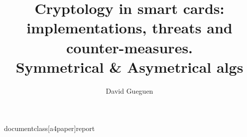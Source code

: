 documentclass[a4paper]{report}
\author{David Gueguen}
\title{Cryptology in smart cards:\\		
		implementations, threats and counter-measures.\\
			Symmetrical \& Asymetrical algs\\						
			}
\usepackage[pdfauthor={David Gueguen},pdftitle={STATeOfTHeARtSmardCardsCryptology},pagebackref,pdftex]{hyperref}	 	
\hypersetup{colorlinks,	
	citecolor=red, filecolor=black, 
		linkcolor=black, urlcolor=blue }
			
\usepackage[a4paper, no foot,hmargin=1.5cm, vmargin=1.5cm,
			 left=1.4cm, right=1.4cm	]
			 	{geometry}

\usepackage[latin1]{inputenc}
\usepackage{textcomp}
\usepackage{graphicx}
\usepackage{mathrsfs, amssymb, bbm, amssymb}
\usepackage{amsmath, amsthm, amsfonts, latexsym, stmaryrd}
\usepackage{marvosym}%


\usepackage{epsfig}
\usepackage[linesnumbered,ruled,vlined]{algorithm2e}



\addtocounter{tocdepth}{3}
\setcounter{secnumdepth}{3} 


\setlength{\parskip}{1em}			 	
\setlength\parindent{20pt}		%
\medskip						%

\usepackage{makeidx}
\makeindex	


\usepackage{natbib}
%

%	



\usepackage{colortbl}
\usepackage{tabularx}
\usepackage{supertabular}
\usepackage{multirow}
\usepackage{relsize}
\usepackage{longtable}

\usepackage{amsthm}
\usepackage{mathrsfs}
\usepackage{pdflscape}
\usepackage{pdfpages}

\usepackage{footnote}
\usepackage{natbib}




